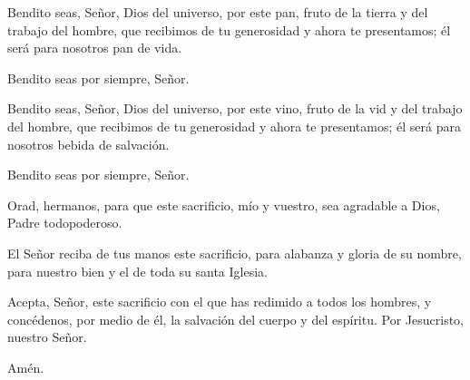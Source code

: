 \pr Bendito seas, Señor, Dios del universo, por este pan, fruto de la tierra y del trabajo del hombre, que recibimos de tu generosidad y ahora te presentamos; él será para nosotros pan de vida.

\be Bendito seas por siempre, Señor.

\pr Bendito seas, Señor, Dios del universo, por este vino, fruto de la vid y del trabajo del hombre, que recibimos de tu generosidad y ahora te presentamos; él será para nosotros bebida de salvación.

\be Bendito seas por siempre, Señor.

\pr Orad, hermanos, para que este sacrificio, mío y vuestro, sea agradable a Dios, Padre todopoderoso.

\be El Señor reciba de tus manos este sacrificio, para alabanza y gloria de su nombre, para nuestro bien y el de toda su santa Iglesia.

\pr Acepta, Señor, este sacrificio con el que has redimido a todos los hombres, y concédenos, por medio de él, la salvación del cuerpo y del espíritu. Por Jesucristo, nuestro Señor.

\be Amén.
